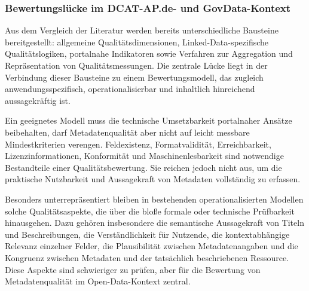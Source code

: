 


\subsubsection{Bewertungslücke im DCAT-AP.de- und GovData-Kontext}
\label{sec:bewertungsluecke}

Aus dem Vergleich der Literatur werden bereits unterschiedliche Bausteine bereitgestellt: allgemeine Qualitätsdimensionen, Linked-Data-spezifische Qualitätslogiken, portalnahe Indikatoren sowie Verfahren zur Aggregation und Repräsentation von Qualitätsmessungen. Die zentrale Lücke liegt in der Verbindung dieser Bausteine zu einem Bewertungsmodell, das zugleich anwendungsspezifisch, operationalisierbar und inhaltlich hinreichend aussagekräftig ist.

Ein geeignetes Modell muss die technische Umsetzbarkeit portalnaher Ansätze beibehalten, darf Metadatenqualität aber nicht auf leicht messbare Mindestkriterien verengen. Feldexistenz, Formatvalidität, Erreichbarkeit, Lizenzinformationen, Konformität und Maschinenlesbarkeit sind notwendige Bestandteile einer Qualitätsbewertung. Sie reichen jedoch nicht aus, um die praktische Nutzbarkeit und Aussagekraft von Metadaten vollständig zu erfassen.

Besonders unterrepräsentiert bleiben in bestehenden operationalisierten Modellen solche Qualitätsaspekte, die über die bloße formale oder technische Prüfbarkeit hinausgehen. Dazu gehören insbesondere die semantische Aussagekraft von Titeln und Beschreibungen, die Verständlichkeit für Nutzende, die kontextabhängige Relevanz einzelner Felder, die Plausibilität zwischen Metadatenangaben und die Kongruenz zwischen Metadaten und der tatsächlich beschriebenen Ressource. Diese Aspekte sind schwieriger zu prüfen, aber für die Bewertung von Metadatenqualität im Open-Data-Kontext zentral.

